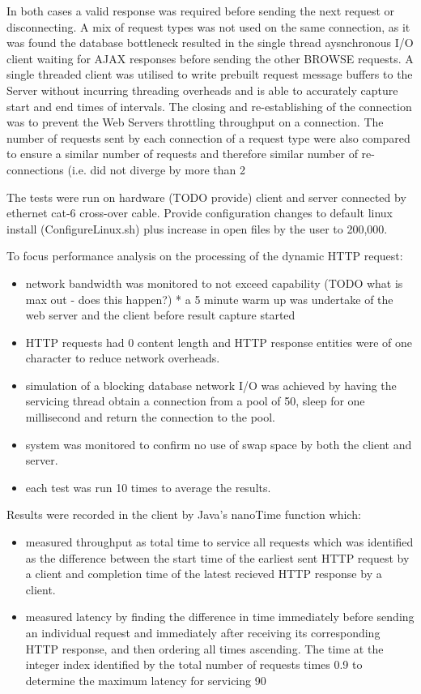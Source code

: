 \documentclass[conference]{ieee/IEEEtran}
\begin{document}
In both cases a valid response was required before sending the next request or
disconnecting.  A mix of request types was not used on the same connection, as
it was found the database bottleneck resulted in the single thread aysnchronous
I/O client waiting for AJAX responses before sending the other BROWSE requests.
A single threaded client was utilised to write prebuilt request message buffers
to the Server without incurring threading overheads and is able to accurately
capture start and end times of intervals.  The closing and re-establishing of
the connection was to prevent the Web Servers throttling throughput on a
connection.  The number of requests sent by each connection of a request type
were also compared to ensure a similar number of requests and therefore similar
number of re-connections (i.e. did not diverge by more than 2%

The tests were run on hardware (TODO provide) client and server connected by
ethernet cat-6 cross-over cable.  Provide configuration changes to default
linux install (ConfigureLinux.sh) plus increase in open files by the user to
200,000.

To focus performance analysis on the processing of the dynamic HTTP request:
\begin{itemize}
  \item network bandwidth was monitored to not exceed capability (TODO what is
max out - does this happen?) * a 5 minute warm up was undertake of the web server
and the client before result capture started
  \item HTTP requests had 0 content length and HTTP response entities were of
 one character to reduce network overheads.
  \item simulation of a blocking database network I/O was achieved by having the
  servicing thread obtain a connection from a pool of 50, sleep for one
  millisecond and return the connection to the pool.
  \item system was monitored to confirm no use of swap space by both the client
  and server.
  \item each test was run 10 times to average the results.
\end{itemize}
 
Results were recorded in the client by Java's nanoTime function which:
\begin{itemize}
  \item measured throughput as total time to service all requests which was
  identified as the difference between the start time of the earliest sent HTTP
  request by a client and completion time of the latest recieved HTTP response
  by a client.
  \item measured latency by finding the difference in time immediately before
  sending an individual request and immediately after receiving its
  corresponding HTTP response, and then ordering all times ascending.  The time
  at the integer index identified by the total number of requests times 0.9 to
  determine the maximum latency for servicing 90%
\end{itemize}
\end{document}
